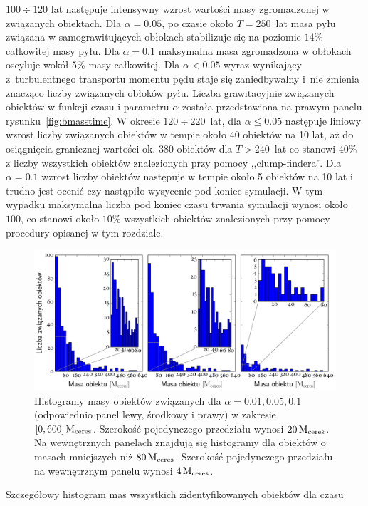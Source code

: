 $100\div120$ lat następuje intensywny wzrost wartości masy zgromadzonej w
związanych obiektach. Dla $\alpha = 0.05$, po czasie około $T = 250$~lat masa
pyłu związana w samograwitujących obłokach stabilizuje się na poziomie $14\%$
całkowitej masy pyłu. Dla $\alpha = 0.1$ maksymalna masa zgromadzona w obłokach
oscyluje wokół $5\%$ masy całkowitej. Dla $\alpha < 0.05$ wyraz wynikający
z~turbulentnego transportu momentu pędu staje się zaniedbywalny i~nie zmienia
znacząco liczby związanych obłoków pyłu. Liczba grawitacyjnie związanych
obiektów w funkcji czasu i parametru $\alpha$ została przedstawiona na prawym
panelu rysunku~\ref{fig:bmasstime}. W okresie $120 \div 220$~lat, dla $\alpha
\leq 0.05$ następuje liniowy wzrost liczby związanych obiektów w tempie około 40
obiektów na 10 lat, aż do osiągnięcia granicznej wartości ok. $380$ obiektów dla
$T > 240$~lat co stanowi $40\%$ z liczby wszystkich obiektów znalezionych przy
pomocy ,,clump-findera''. Dla $\alpha = 0.1$ wzrost liczby obiektów następuje w tempie
około 5 obiektów na 10 lat i trudno jest ocenić czy nastąpiło wysycenie
pod koniec symulacji. W tym wypadku maksymalna liczba pod koniec czasu trwania
symulacji wynosi około $100$, co stanowi około $10\%$ wszystkich obiektów
znalezionych przy pomocy procedury opisanej w tym rozdziale.
%
\begin{figure}[ht]
   \centering
   \includegraphics[width=0.95\linewidth]{figures/mass_hists}
   \caption{Histogramy masy obiektów związanych dla $\alpha = 0.01, 0.05, 0.1$
   (odpowiednio panel lewy, środkowy i prawy) w zakresie $[0,600]\hbox{$\mathrm{\thinspace M_{\textrm{ceres}}}$}$.
   Szerokość pojedynczego przedziału wynosi $20\hbox{$\mathrm{\thinspace M_{\textrm{ceres}}}$}$. Na wewnętrznych
   panelach znajdują się histogramy dla obiektów o masach mniejszych niż
   $80\hbox{$\mathrm{\thinspace M_{\textrm{ceres}}}$}$. Szerokość pojedynczego przedziału na wewnętrznym panelu wynosi
   $4\hbox{$\mathrm{\thinspace M_{\textrm{ceres}}}$}$.}
   \label{fig:masshist}
\end{figure}
%
\par Szczegółowy histogram mas wszystkich zidentyfikowanych obiektów dla czasu
